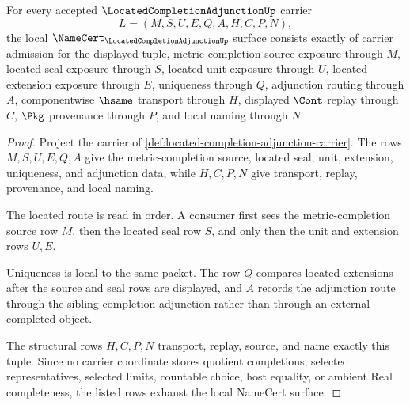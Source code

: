 \begin{theorem}
\label{thm:located-completion-adjunction-namecert-obligations}
For every accepted $\LocatedCompletionAdjunctionUp$ carrier
$$
L=(M,S,U,E,Q,A,H,C,P,N),
$$
the local $\NameCert_{\LocatedCompletionAdjunctionUp}$ surface consists exactly of carrier admission for the displayed tuple, metric-completion source exposure through $M$, located seal exposure through $S$, located unit exposure through $U$, located extension exposure through $E$, uniqueness through $Q$, adjunction routing through $A$, componentwise $\hsame$ transport through $H$, displayed $\Cont$ replay through $C$, $\Pkg$ provenance through $P$, and local naming through $N$.
\end{theorem}
\begin{proof}
Project the carrier of \autoref{def:located-completion-adjunction-carrier}. The rows $M,S,U,E,Q,A$ give the metric-completion source, located seal, unit, extension, uniqueness, and adjunction data, while $H,C,P,N$ give transport, replay, provenance, and local naming.

The located route is read in order. A consumer first sees the metric-completion source row $M$, then the located seal row $S$, and only then the unit and extension rows $U,E$.

Uniqueness is local to the same packet. The row $Q$ compares located extensions after the source and seal rows are displayed, and $A$ records the adjunction route through the sibling completion adjunction rather than through an external completed object.

The structural rows $H,C,P,N$ transport, replay, source, and name exactly this tuple. Since no carrier coordinate stores quotient completions, selected representatives, selected limits, countable choice, host equality, or ambient Real completeness, the listed rows exhaust the local NameCert surface.
\end{proof}

